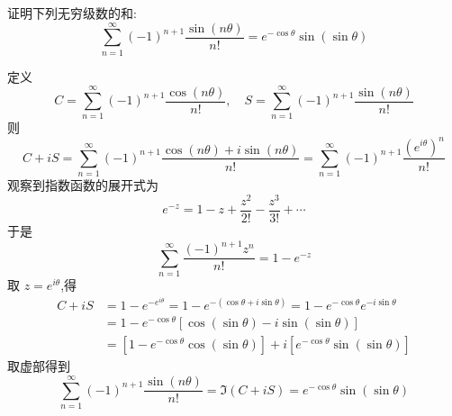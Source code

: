 \begin{questions}

    \question 证明下列无穷级数的和:
    \[
    \sum_{n=1}^{\infty} (-1)^{n+1} \frac{\sin(n\theta)}{n!} = e^{-\cos\theta}\sin(\sin\theta)
    \]
    \begin{solution}
        定义
        \[
        C = \sum_{n=1}^{\infty} (-1)^{n+1} \frac{\cos(n\theta)}{n!},\quad 
        S = \sum_{n=1}^{\infty} (-1)^{n+1} \frac{\sin(n\theta)}{n!}
        \]
        则
        \[
        C+iS = \sum_{n=1}^{\infty} (-1)^{n+1} \frac{\cos(n\theta)+i\sin(n\theta)}{n!} 
        = \sum_{n=1}^{\infty} (-1)^{n+1} \frac{(e^{i\theta})^n}{n!}
        \]
        观察到指数函数的展开式为
        \[
        e^{-z} = 1 - z + \frac{z^2}{2!} - \frac{z^3}{3!} + \cdots
        \]
        于是
        \[
        \sum_{n=1}^{\infty} \frac{(-1)^{n+1} z^n}{n!} = 1 - e^{-z}
        \]
        取 $z = e^{i\theta}$,得
        \begin{align*}
        C+iS &= 1 - e^{-e^{i\theta}} = 1 - e^{-(\cos\theta + i\sin\theta)} = 1 - e^{-\cos\theta} e^{-i\sin\theta}\\
        &= 1 - e^{-\cos\theta} [\cos(\sin\theta) - i \sin(\sin\theta)] \\
        &= [1 - e^{-\cos\theta}\cos(\sin\theta)] + i [e^{-\cos\theta}\sin(\sin\theta)]
        \end{align*}
        取虚部得到
        \[
        \sum_{n=1}^{\infty} (-1)^{n+1} \frac{\sin(n\theta)}{n!} = \Im(C+iS) = e^{-\cos\theta}\sin(\sin\theta)
        \]
    \end{solution}


\end{questions}
